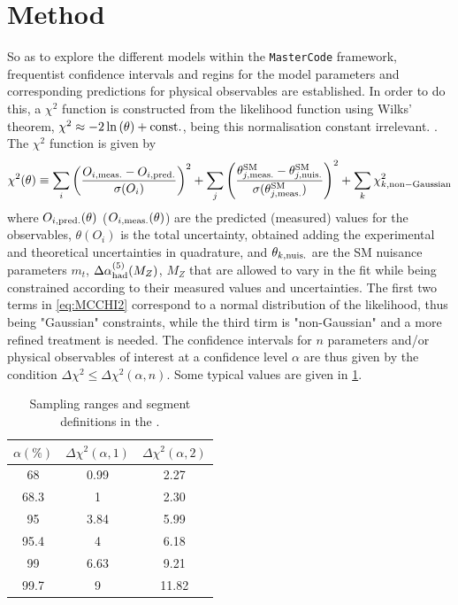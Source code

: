 \section{Method}
So as to explore the different models within the \texttt{MasterCode} framework, frequentist confidence intervals and regins for the model parameters and corresponding predictions for physical observables are established. In order to do this, a $\chi^2$ function is constructed from the likelihood function using Wilks' theorem, $\chi^2 \approx -2\ln{(\theta)} + \rm const.$, being this normalisation constant irrelevant. .  The $\chi^2$ function is given by
\begin{equation}
\chi^2(\theta) \equiv \sum_i \left( \frac{O_{i,\rm meas.}-O_{i,\rm pred.}}{\sigma(O_i)}\right) ^2 + \sum_j \left( \frac{\theta_{j,\rm meas.}^{\rm SM}-\theta_{j,\rm nuis.}^{\rm SM}}{\sigma(\theta_{j,\rm meas.}^{\rm SM})}\right) ^2 + \sum_k \chi^2_{k,\rm non-Gaussian}
\label{eq:MCCHI2}
\end{equation}
where $O_{i,\rm pred.}(\theta)$ ($O_{i,\rm meas.}(\theta)$)  are the predicted (measured) values for the observables, $\theta(O_i)$ is the total uncertainty, obtained adding the experimental and theoretical uncertainties in quadrature, and $\theta_{k,\rm nuis.}$ are the SM nuisance parameters {$m_t$, $\Delta \alpha_{\rm had}^{(5)}(M_Z)$, $M_Z$} that are allowed to vary in the fit while being constrained according to their measured values and uncertainties. The first two terms in \ref{eq:MCCHI2} correspond to a normal distribution of the likelihood, thus being "Gaussian" constraints, while the third tirm is "non-Gaussian" and a more refined treatment is needed. 
The confidence intervals for $n$ parameters and/or physical observables of interest at a confidence level $\alpha$ are thus given by the condition $\Delta \chi^2 \leq \Delta \chi^2(\alpha,n)$. Some typical values are given in \ref{tab:CL}.

\begin{table}[h]
  \begin{center}
     \caption{Sampling ranges and segment definitions in the .}
  \begin{tabular}{|c|c|c|}
  \hline
  $\alpha(\%)$ & $\Delta \chi^2(\alpha,1)$ & $\Delta \chi^2(\alpha,2)$ \\
  \hline
  68 & 0.99 & 2.27 \\
  68.3 & 1 & 2.30 \\
    \hline
  95 & 3.84 & 5.99 \\
  95.4 & 4 & 6.18 \\
  \hline
  99 & 6.63 & 9.21 \\
  99.7 & 9 & 11.82 \\
  \hline
  \end{tabular}
  \label{tab:CL}
  \end{center}
\end{table}

